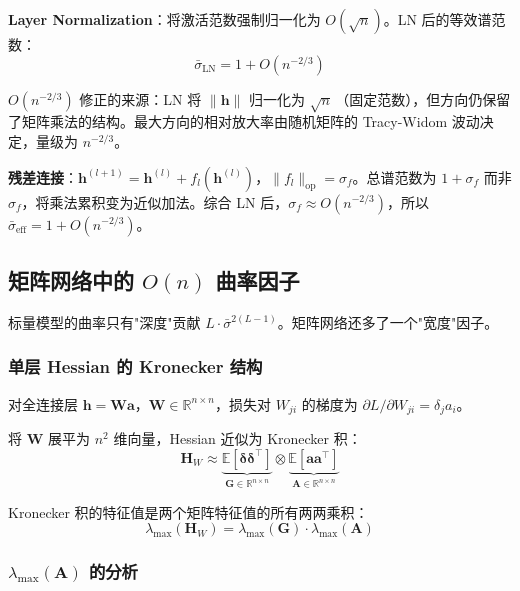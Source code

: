 \documentclass[12pt, a4paper]{ctexart}
\begin{document}
\textbf{Layer Normalization}：将激活范数强制归一化为 $O(\sqrt{n})$。LN 后的等效谱范数：
\begin{equation}
    \bar{\sigma}_{\text{LN}} = 1 + O(n^{-2/3})
\end{equation}

$O(n^{-2/3})$ 修正的来源：LN 将 $\|\mathbf{h}\|$ 归一化为 $\sqrt{n}\,$（固定范数），但方向仍保留了矩阵乘法的结构。最大方向的相对放大率由随机矩阵的 Tracy-Widom 波动决定，量级为 $n^{-2/3}$。

\textbf{残差连接}：$\mathbf{h}^{(l+1)} = \mathbf{h}^{(l)} + f_l(\mathbf{h}^{(l)})$，$\|f_l\|_{\text{op}} = \sigma_f$。总谱范数为 $1 + \sigma_f$ 而非 $\sigma_f$，将乘法累积变为近似加法。综合 LN 后，$\sigma_f \approx O(n^{-2/3})$，所以 $\bar{\sigma}_{\text{eff}} = 1 + O(n^{-2/3})$。

\subsection{矩阵网络中的 $O(n)$ 曲率因子}

标量模型的曲率只有"深度"贡献 $L \cdot \bar{\sigma}^{2(L-1)}$。矩阵网络还多了一个"宽度"因子。

\subsubsection{单层 Hessian 的 Kronecker 结构}

对全连接层 $\mathbf{h} = \mathbf{W}\mathbf{a}$，$\mathbf{W} \in \mathbb{R}^{n \times n}$，损失对 $W_{ji}$ 的梯度为 $\partial L/\partial W_{ji} = \delta_j a_i$。

将 $\mathbf{W}$ 展平为 $n^2$ 维向量，Hessian 近似为 Kronecker 积：
\begin{equation}
    \mathbf{H}_W \approx \underbrace{\mathbb{E}[\boldsymbol{\delta}\boldsymbol{\delta}^\top]}_{\mathbf{G}\in\mathbb{R}^{n \times n}} \otimes \underbrace{\mathbb{E}[\mathbf{a}\mathbf{a}^\top]}_{\mathbf{A}\in\mathbb{R}^{n \times n}}
\end{equation}

Kronecker 积的特征值是两个矩阵特征值的所有两两乘积：
\begin{equation}
    \lambda_{\max}(\mathbf{H}_W) = \lambda_{\max}(\mathbf{G}) \cdot \lambda_{\max}(\mathbf{A})
\end{equation}

\subsubsection{$\lambda_{\max}(\mathbf{A})$ 的分析}
\end{document}
